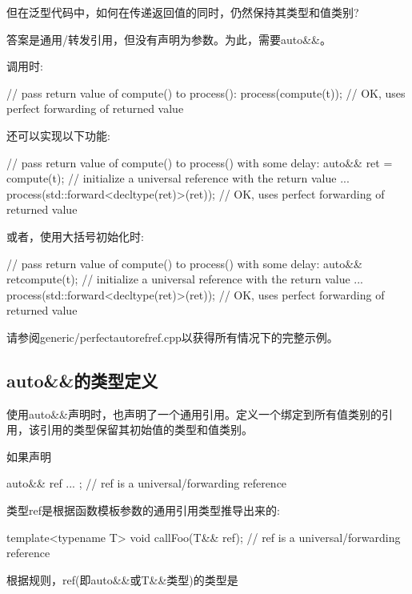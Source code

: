 但在泛型代码中，如何在传递返回值的同时，仍然保持其类型和值类别?

答案是通用/转发引用，但没有声明为参数。为此，需要auto\&\&。

调用时:

\begin{cppcode}
// pass return value of compute() to process():
process(compute(t)); // OK, uses perfect forwarding of returned value
\end{cppcode}

还可以实现以下功能:

\begin{cppcode}
// pass return value of compute() to process() with some delay:
auto&& ret = compute(t); // initialize a universal reference with the return value
...
process(std::forward<decltype(ret)>(ret)); // OK, uses perfect forwarding of returned value
\end{cppcode}

或者，使用大括号初始化时:

\begin{cppcode}
// pass return value of compute() to process() with some delay:
auto&& ret{compute(t)}; // initialize a universal reference with the return value
...
process(std::forward<decltype(ret)>(ret)); // OK, uses perfect forwarding of returned value
\end{cppcode}

请参阅generic/perfectautorefref.cpp以获得所有情况下的完整示例。

\subsection{auto\&\&的类型定义}

使用auto\&\&声明时，也声明了一个通用引用。定义一个绑定到所有值类别的引用，该引用的类型保留其初始值的类型和值类别。

如果声明

\begin{cppcode}
auto&& ref{ ... }; // ref is a universal/forwarding reference
\end{cppcode}

类型ref是根据函数模板参数的通用引用类型推导出来的:

\begin{cppcode}
template<typename T>
void callFoo(T&& ref); // ref is a universal/forwarding reference
\end{cppcode}

根据规则，ref(即auto\&\&或T\&\&类型)的类型是

